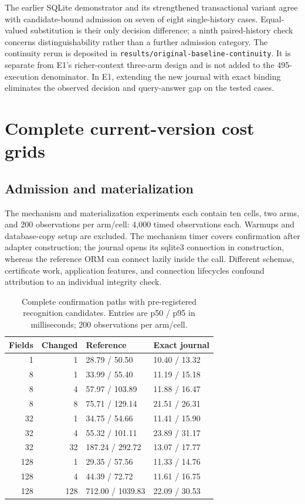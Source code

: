 \documentclass[11pt,a4paper]{article}
\newcommand{\code}[1]{\nolinkurl{#1}}
\begin{document}
The earlier SQLite demonstrator and its strengthened transactional variant agree with candidate-bound admission on seven of eight single-history cases. Equal-valued substitution is their only decision difference; a ninth paired-history check concerns distinguishability rather than a further admission category. The continuity rerun is deposited in \code{results/original-baseline-continuity}. It is separate from E1's richer-context three-arm design and is not added to the 495-execution denominator. In E1, extending the new journal with exact binding eliminates the observed decision and query-answer gap on the tested cases.

\section{Complete current-version cost grids}
\label{app:cost-grids}

\subsection{Admission and materialization}

The mechanism and materialization experiments each contain ten cells, two arms, and 200 observations per arm/cell: 4,000 timed observations each. Warmups and database-copy setup are excluded. The mechanism timer covers confirmation after adapter construction; the journal opens its sqlite3 connection in construction, whereas the reference ORM can connect lazily inside the call. Different schemas, certificate work, application features, and connection lifecycles confound attribution to an individual integrity check.

\begin{table}[htbp]
\centering\small
\caption{Complete confirmation paths with pre-registered recognition candidates. Entries are p50 / p95 in milliseconds; 200 observations per arm/cell.}
\label{tab:s-mechanism-grid}
\begin{tabular}{@{}rrll@{}}
\toprule
Fields & Changed & Reference & Exact journal \\
\midrule
1 & 1 & 28.79 / 50.50 & 10.40 / 13.32 \\
8 & 1 & 33.99 / 55.40 & 11.19 / 15.18 \\
8 & 4 & 57.97 / 103.89 & 11.88 / 16.47 \\
8 & 8 & 75.71 / 129.14 & 21.51 / 26.31 \\
32 & 1 & 34.75 / 54.66 & 11.41 / 15.90 \\
32 & 4 & 55.32 / 101.11 & 23.89 / 31.17 \\
32 & 32 & 187.24 / 292.72 & 13.07 / 17.77 \\
128 & 1 & 29.35 / 57.56 & 11.33 / 14.76 \\
128 & 4 & 44.39 / 72.72 & 11.61 / 16.75 \\
128 & 128 & 712.00 / 1039.83 & 22.09 / 30.53 \\
\bottomrule\end{tabular}\end{table}
\end{document}
